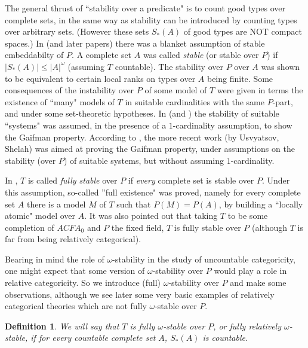 \documentclass[12pt]{article}
\newtheorem{Definition}[Theorem]{Definition}
\begin{document}
The general thrust of ``stability over a predicate" is to count good types over complete sets, in the same way as stability can be introduced by counting types over  arbitrary sets. (However these sets $S_{*}(A)$ of good types are NOT compact spaces.)   In \cite{Pillay-Shelah} (and  later papers)   there was a blanket assumption of stable embeddabilty of $P$.  A complete set $A$ was called {\em stable}  (or stable over $P$) if  $|S_{*}(A)| \leq |A|^{\omega}$  (assuming $T$ countable).   The stability over $P$ over $A$ was shown to be equivalent to certain local ranks on types over $A$ being finite.  Some consequences of the instability over $P$ of some model of $T$ were given in  terms the existence of ``many" models of $T$ in suitable cardinalities with the same $P$-part, and under some set-theoretic hypotheses.  In \cite{Shelah-classification-II} (and \cite{AlZurba})  the stability of suitable ``systems" was assumed, in the presence of a $1$-cardinality assumption, to show the Gaifman property.  According to \cite{Usvyatsov}, the more recent work (by Usvyatsov, Shelah) was aimed at proving the Gaifman property,  under assumptions on the stability (over $P$) of suitable systems, but without assuming $1$-cardinality.


In \cite{Usvyatsov}, $T$  is called {\em fully stable} over $P$ if {\em every}  complete set is stable over $P$.   Under this assumption, so-called ''full existence" was proved, namely for every complete set $A$ there is a model $M$ of $T$ such that $P(M) = P(A)$, by building a ``locally atomic" model over $A$.    It was also pointed out that taking $T$ to be some completion of $ACFA_{0}$ and $P$ the fixed field, $T$ is fully stable over $P$ (although $T$ is far from being relatively categorical).

Bearing in mind the role of $\omega$-stability in the study of uncountable categoricity, one might expect that some version of $\omega$-stability over $P$ would play a role in relative categoricity.  So we introduce (full)  $\omega$-stability over $P$ and make some observations, although we see later some very basic examples of relatively categorical theories which are not fully $\omega$-stable over $P$. 



\begin{Definition} We will say that $T$ is fully $\omega$-stable over $P$, or fully  relatively $\omega$-stable, if for every countable complete set $A$, $S_{*}(A)$ is countable. 
\end{Definition} 
\end{document}
